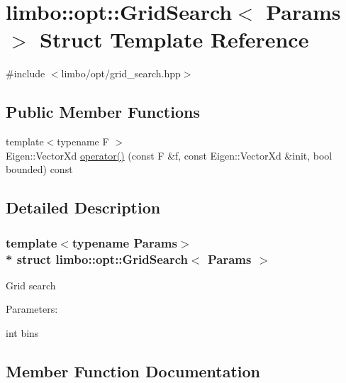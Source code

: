 \hypertarget{structlimbo_1_1opt_1_1_grid_search}{}\section{limbo\+:\+:opt\+:\+:Grid\+Search$<$ Params $>$ Struct Template Reference}
\label{structlimbo_1_1opt_1_1_grid_search}


{\ttfamily \#include $<$limbo/opt/grid\+\_\+search.\+hpp$>$}

\subsection*{Public Member Functions}
\begin{DoxyCompactItemize}
\item 
{\footnotesize template$<$typename F $>$ }\\Eigen\+::\+Vector\+Xd \hyperlink{structlimbo_1_1opt_1_1_grid_search_a33545a99e631d9e35776a7d7a582c8a2}{operator()} (const F \&f, const Eigen\+::\+Vector\+Xd \&init, bool bounded) const 
\end{DoxyCompactItemize}


\subsection{Detailed Description}
\subsubsection*{template$<$typename Params$>$\\*
struct limbo\+::opt\+::\+Grid\+Search$<$ Params $>$}

Grid search

Parameters\+:
\begin{DoxyItemize}
\item int bins 
\end{DoxyItemize}

\subsection{Member Function Documentation}
